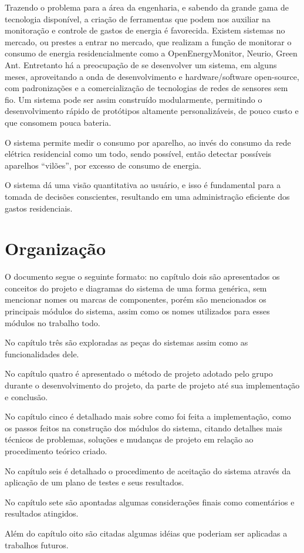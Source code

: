 Trazendo o problema para a área da engenharia, e sabendo da grande gama de tecnologia disponível, a criação de ferramentas que podem nos auxiliar na monitoração e controle de gastos de energia é favorecida. Existem sistemas no mercado, ou prestes a entrar no mercado, que realizam a função de monitorar o consumo de energia residencialmente como a OpenEnergyMonitor\cite{open_energy_monitor}, Neurio\cite{neurio_site}, Green Ant\cite{green_ant_site}. Entretanto há a preocupação de se desenvolver um sistema, em alguns meses, aproveitando a onda de desenvolvimento e hardware/software open-source, com padronizações e a comercialização de tecnologias de redes de sensores sem fio. Um sistema pode ser assim construído modularmente, permitindo o desenvolvimento rápido de protótipos altamente personalizáveis, de pouco custo e que consomem pouca bateria.

O sistema permite medir o consumo por aparelho, ao invés do consumo da rede elétrica residencial como um todo, sendo possível, então detectar possíveis aparelhos “vilões”, por excesso de consumo de energia.

O sistema dá uma visão quantitativa ao usuário, e isso é fundamental para a tomada de decisões conscientes, resultando em uma administração eficiente dos gastos residenciais.

\section{Organização}
\label{Sec:organizacao}

O documento segue o seguinte formato: no capítulo dois são apresentados os conceitos do projeto e diagramas do sistema de uma forma genérica, sem mencionar nomes ou marcas de componentes, porém são mencionados os principais módulos do sistema, assim como os nomes utilizados para esses módulos no trabalho todo.

No capítulo três são exploradas as peças do sistemas assim como as funcionalidades dele.

No capítulo quatro é apresentado o método de projeto adotado pelo grupo durante o desenvolvimento do projeto, da parte de projeto até sua implementação e conclusão.

No capítulo cinco é detalhado mais sobre como foi feita a implementação, como os passos feitos na construção dos módulos do sistema, citando detalhes mais técnicos de problemas, soluções e mudanças de projeto em relação ao procedimento teórico criado.

No capítulo seis é detalhado o procedimento de aceitação do sistema através da aplicação de um plano de testes e seus resultados.

No capítulo sete são apontadas algumas considerações finais como comentários e resultados atingidos.

Além do capítulo oito são citadas algumas idéias que poderiam ser aplicadas a trabalhos futuros.